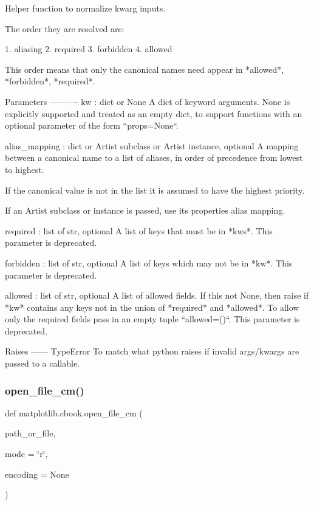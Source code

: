 \begin{DoxyVerb}Helper function to normalize kwarg inputs.

The order they are resolved are:

1. aliasing
2. required
3. forbidden
4. allowed

This order means that only the canonical names need appear in
*allowed*, *forbidden*, *required*.

Parameters
----------
kw : dict or None
    A dict of keyword arguments.  None is explicitly supported and treated
    as an empty dict, to support functions with an optional parameter of
    the form ``props=None``.

alias_mapping : dict or Artist subclass or Artist instance, optional
    A mapping between a canonical name to a list of
    aliases, in order of precedence from lowest to highest.

    If the canonical value is not in the list it is assumed to have
    the highest priority.

    If an Artist subclass or instance is passed, use its properties alias
    mapping.

required : list of str, optional
    A list of keys that must be in *kws*.  This parameter is deprecated.

forbidden : list of str, optional
    A list of keys which may not be in *kw*.  This parameter is deprecated.

allowed : list of str, optional
    A list of allowed fields.  If this not None, then raise if
    *kw* contains any keys not in the union of *required*
    and *allowed*.  To allow only the required fields pass in
    an empty tuple ``allowed=()``.  This parameter is deprecated.

Raises
------
TypeError
    To match what python raises if invalid args/kwargs are passed to
    a callable.
\end{DoxyVerb}
 \mbox{\label{namespacematplotlib_1_1cbook_a0d81ce7993d622e377e9d8412d626efd}} 
\subsubsection{\texorpdfstring{open\+\_\+file\+\_\+cm()}{open\_file\_cm()}}
{\footnotesize\ttfamily def matplotlib.\+cbook.\+open\+\_\+file\+\_\+cm (\begin{DoxyParamCaption}\item[{}]{path\+\_\+or\+\_\+file,  }\item[{}]{mode = {\ttfamily \char`\"{}r\char`\"{}},  }\item[{}]{encoding = {\ttfamily None} }\end{DoxyParamCaption})}

